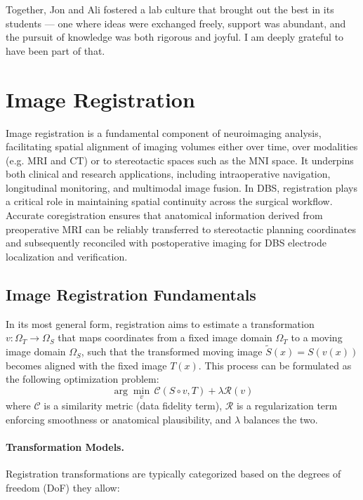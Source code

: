 Together, Jon and Ali fostered a lab culture that brought out the best in its students — one where ideas were exchanged freely, support was abundant, and the pursuit of knowledge was both rigorous and joyful. I am deeply grateful to have been part of that.










\section{Image Registration}
\label{sec:registration}
Image registration is a fundamental component of neuroimaging analysis, facilitating spatial alignment of imaging volumes either over time, over modalities (e.g. MRI and CT) or to stereotactic spaces such as the MNI space. It underpins both clinical and research applications, including intraoperative navigation, longitudinal monitoring, and multimodal image fusion. In DBS, registration plays a critical role in maintaining spatial continuity across the surgical workflow. Accurate coregistration ensures that anatomical information derived from preoperative MRI can be reliably transferred to stereotactic planning coordinates and subsequently reconciled with postoperative imaging for DBS electrode localization and verification.

\subsection{Image Registration Fundamentals}
In its most general form, registration aims to estimate a transformation \( v: \Omega_T \rightarrow \Omega_S \) that maps coordinates from a fixed image domain \( \Omega_T \) to a moving image domain \( \Omega_S \), such that the transformed moving image \( \tilde{S}(x) = S(v(x)) \) becomes aligned with the fixed image \( T(x) \). This process can be formulated as the following optimization problem:
\begin{equation}
    \arg\min_{v} \, \mathcal{C}(S \circ v, T) + \lambda \mathcal{R}(v)
    \label{eq:registration_loss}
\end{equation}
where \( \mathcal{C} \) is a similarity metric (data fidelity term), \( \mathcal{R} \) is a regularization term enforcing smoothness or anatomical plausibility, and \( \lambda \) balances the two.
\paragraph{Transformation Models.}
Registration transformations are typically categorized based on the degrees of freedom (DoF) they allow:

